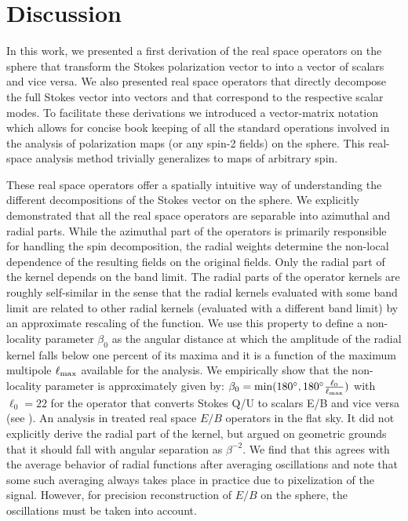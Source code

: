 \section{Discussion}\label{sec:discussion}
In this work, we presented a first derivation of the real space operators on the sphere that transform the Stokes polarization vector to into a vector of scalars and vice versa.  We also presented real space operators that directly decompose the full Stokes vector \vp{} into vectors  and  that correspond to the respective scalar modes.  To facilitate these derivations we introduced a vector-matrix notation which allows for concise book keeping of all the standard operations involved in the analysis of  polarization maps (or any spin-2 fields) on the sphere. This real-space analysis method trivially generalizes to maps of arbitrary spin.

These real space operators offer a spatially intuitive way of understanding the different decompositions of the Stokes vector on the sphere. We explicitly  demonstrated that all the real space operators are separable into azimuthal and radial parts. While the azimuthal part of the operators is primarily responsible for handling the spin decomposition, the radial weights determine the non-local dependence of the resulting fields on the original fields.  Only the radial part of the kernel depends on the band limit. 
The radial parts of the operator kernels are roughly self-similar in the sense that the radial kernels evaluated with some band limit are related to other radial kernels (evaluated with a different band limit) by an approximate rescaling of the function. We use this property to define a non-locality parameter $\beta_0$ as the angular distance at which the amplitude of the radial kernel falls below one percent of its maxima and it  is a function of the maximum multipole $\ell_{\rm max}$ available for the analysis. We empirically show that the non-locality parameter is approximately given by: $\beta_0 = \mathrm{min}(180^{\circ}, 180^{\circ} \frac{\ell_{0}}{\ell_{\rm max}})$ with $\ell_{0}=22$ for the operator that converts Stokes Q/U to scalars E/B and vice versa (see ). An analysis in  \cite{Zaldarriaga2001a} treated real space $E/B$ operators in the flat sky.  It did not explicitly derive the radial part of the kernel, but argued on geometric grounds that it should fall with angular separation as $\beta^{-2}$.  We find that this agrees with the average behavior of radial functions after averaging oscillations and note that some such averaging always takes place in practice due to pixelization of the signal.  However, for precision reconstruction of $E/B$ on the sphere, the oscillations must be taken into account.


